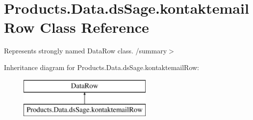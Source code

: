 \hypertarget{class_products_1_1_data_1_1ds_sage_1_1kontaktemail_row}{}\section{Products.\+Data.\+ds\+Sage.\+kontaktemail\+Row Class Reference}
\label{class_products_1_1_data_1_1ds_sage_1_1kontaktemail_row}


Represents strongly named Data\+Row class. /summary$>$  


Inheritance diagram for Products.\+Data.\+ds\+Sage.\+kontaktemail\+Row\+:\begin{figure}[H]
\begin{center}
\leavevmode
\includegraphics[height=2.000000cm]{class_products_1_1_data_1_1ds_sage_1_1kontaktemail_row}
\end{center}
\end{figure}
